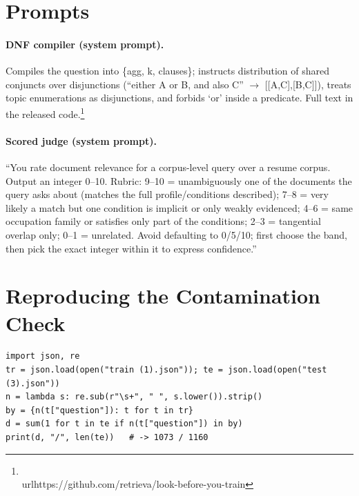 \documentclass[11pt]{article}
\begin{document}
\section{Prompts}
\label{app:prompts}

\paragraph{DNF compiler (system prompt).} Compiles the question into \{agg, k, clauses\}; instructs distribution of shared conjuncts over disjunctions (``either A or B, and also C'' $\rightarrow$ [[A,C],[B,C]]), treats topic enumerations as disjunctions, and forbids `or' inside a predicate. Full text in the released code.\footnote{\\url{https://github.com/retrieva/look-before-you-train}}

\paragraph{Scored judge (system prompt).} ``You rate document relevance for a corpus-level query over a resume corpus. Output an integer 0--10. Rubric: 9--10 = unambiguously one of the documents the query asks about (matches the full profile/conditions described); 7--8 = very likely a match but one condition is implicit or only weakly evidenced; 4--6 = same occupation family or satisfies only part of the conditions; 2--3 = tangential overlap only; 0--1 = unrelated. Avoid defaulting to 0/5/10; first choose the band, then pick the exact integer within it to express confidence.''

\section{Reproducing the Contamination Check}
\label{app:repro}

\begin{verbatim}
import json, re
tr = json.load(open("train (1).json")); te = json.load(open("test (3).json"))
n = lambda s: re.sub(r"\s+", " ", s.lower()).strip()
by = {n(t["question"]): t for t in tr}
d = sum(1 for t in te if n(t["question"]) in by)
print(d, "/", len(te))   # -> 1073 / 1160
\end{verbatim}
\end{document}
